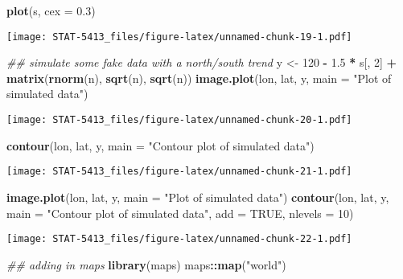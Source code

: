 \documentclass[]{book}
\newenvironment{Shaded}{\begin{snugshade}}{\end{snugshade}}
\newcommand{\CommentTok}[1]{\textcolor[rgb]{0.56,0.35,0.01}{\textit{#1}}}
\newcommand{\DataTypeTok}[1]{\textcolor[rgb]{0.13,0.29,0.53}{#1}}
\newcommand{\DecValTok}[1]{\textcolor[rgb]{0.00,0.00,0.81}{#1}}
\newcommand{\FloatTok}[1]{\textcolor[rgb]{0.00,0.00,0.81}{#1}}
\newcommand{\KeywordTok}[1]{\textcolor[rgb]{0.13,0.29,0.53}{\textbf{#1}}}
\newcommand{\NormalTok}[1]{#1}
\newcommand{\OperatorTok}[1]{\textcolor[rgb]{0.81,0.36,0.00}{\textbf{#1}}}
\newcommand{\OtherTok}[1]{\textcolor[rgb]{0.56,0.35,0.01}{#1}}
\newcommand{\StringTok}[1]{\textcolor[rgb]{0.31,0.60,0.02}{#1}}
\begin{document}
\begin{Shaded}
\begin{Highlighting}[]
\KeywordTok{plot}\NormalTok{(s, }\DataTypeTok{cex =} \FloatTok{0.3}\NormalTok{)}
\end{Highlighting}
\end{Shaded}

\texttt{[image: STAT-5413\_files/figure-latex/unnamed-chunk-19-1.pdf]}

\begin{Shaded}
\begin{Highlighting}[]
\CommentTok{## simulate some fake data with a north/south trend}
\NormalTok{y <-}\StringTok{ }\DecValTok{120} \OperatorTok{-}\StringTok{ }\FloatTok{1.5} \OperatorTok{*}\StringTok{ }\NormalTok{s[, }\DecValTok{2}\NormalTok{] }\OperatorTok{+}\StringTok{ }\KeywordTok{matrix}\NormalTok{(}\KeywordTok{rnorm}\NormalTok{(n), }\KeywordTok{sqrt}\NormalTok{(n), }\KeywordTok{sqrt}\NormalTok{(n))}
\KeywordTok{image.plot}\NormalTok{(lon, lat, y, }\DataTypeTok{main =} \StringTok{"Plot of simulated data"}\NormalTok{)}
\end{Highlighting}
\end{Shaded}

\texttt{[image: STAT-5413\_files/figure-latex/unnamed-chunk-20-1.pdf]}

\begin{Shaded}
\begin{Highlighting}[]
\KeywordTok{contour}\NormalTok{(lon, lat, y, }\DataTypeTok{main =} \StringTok{"Contour plot of simulated data"}\NormalTok{)}
\end{Highlighting}
\end{Shaded}

\texttt{[image: STAT-5413\_files/figure-latex/unnamed-chunk-21-1.pdf]}

\begin{Shaded}
\begin{Highlighting}[]
\KeywordTok{image.plot}\NormalTok{(lon, lat, y, }\DataTypeTok{main =} \StringTok{"Plot of simulated data"}\NormalTok{)}
\KeywordTok{contour}\NormalTok{(lon, lat, y, }\DataTypeTok{main =} \StringTok{"Contour plot of simulated data"}\NormalTok{, }\DataTypeTok{add =} \OtherTok{TRUE}\NormalTok{,}
        \DataTypeTok{nlevels =} \DecValTok{10}\NormalTok{)}
\end{Highlighting}
\end{Shaded}

\texttt{[image: STAT-5413\_files/figure-latex/unnamed-chunk-22-1.pdf]}

\begin{Shaded}
\begin{Highlighting}[]
\CommentTok{## adding in maps}
\KeywordTok{library}\NormalTok{(maps)}
\NormalTok{maps}\OperatorTok{::}\KeywordTok{map}\NormalTok{(}\StringTok{"world"}\NormalTok{)}
\end{Highlighting}
\end{Shaded}
\end{document}
